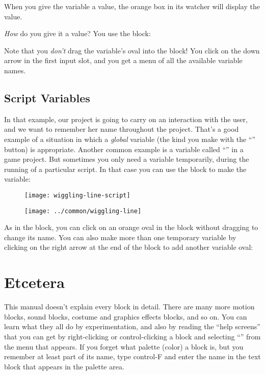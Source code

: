 \documentclass{report}
\begin{document}

When you give the variable a value, the orange box in its watcher will display the value.

\emph{How} do you give it a value? You use the  block:\nopagebreak


Note that you \emph{don't} drag the variable's oval into the  block! You click on the down arrow in the first input slot, and you get a menu of all the available variable names.

\subsection{Script Variables}

In that example, our project is going to carry on an interaction with the user, and we want to remember her name throughout the project. That's a good example of a situation in which a \emph{global} variable (the kind you make with the ``'' button) is appropriate. Another common example is a variable called ``'' in a game project. But sometimes you only need a variable temporarily, during the running of a particular script. In that case you can use the  block to make the variable:\nopagebreak

\begin{figure}[H]
\begin{minipage}{0.5\textwidth}
\centering
\texttt{[image: wiggling-line-script]}%
\end{minipage}%
\begin{minipage}{0.5\textwidth}
\centering
\texttt{[image: ../common/wiggling-line]}
\end{minipage}%
\end{figure}

As in the  block, you can click on an orange oval in the  block without dragging to change its name. You can also make more than one temporary variable by clicking on the right arrow at the end of the block to add another variable oval:\nopagebreak


\section{Etcetera}

This manual doesn't explain every block in detail. There are many more motion blocks, sound blocks, costume and graphics effects blocks, and so on. You can learn what they all do by experimentation, and also by reading the ``help screens'' that you can get by right-clicking or control-clicking a block and selecting ``'' from the menu that appears. If you forget what palette (color) a block is, but you remember at least part of its name, type control-F and enter the name in the text block that appears in the palette area.
\end{document}
